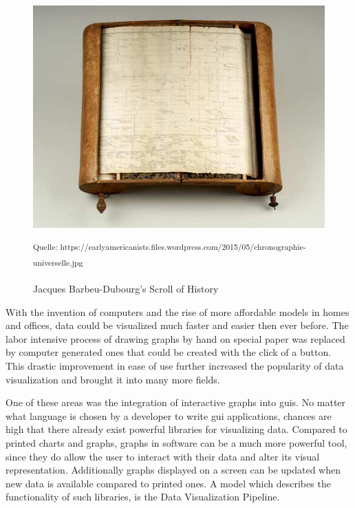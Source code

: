 \begin{figure}[h]
    \centering
    \includegraphics[width=12cm]{resources/img/ScrollOfHistory}
    \caption{Jacques Barbeu-Dubourg's Scroll of History}
    \small\textsuperscript{Quelle: https://earlyamericanists.files.wordpress.com/2015/05/chronographie-universelle.jpg}
    \label{fig:historyscroll}
\end{figure}

With the invention of computers and the rise of more affordable models in homes
and offices, data could be visualized much faster and easier then ever before.
The labor intensive process of drawing graphs by hand on special paper was
replaced by computer generated ones that could be created with the click of a
button. This drastic improvement in ease of use further increased the popularity
of data visualization and brought it into many more fields.
\cite{DataVisHistory2}

One of these areas was the integration of interactive graphs into \glspl{gui}.
No matter what language is chosen by a developer to write \gls{gui}
applications, chances are high that there already exist powerful libraries for
visualizing data. Compared to printed charts and graphs, graphs in software can
be a much more powerful tool, since they do allow the user to interact with
their data and alter its visual representation. Additionally graphs
displayed on a screen can be updated when new data is available compared to
printed ones. A model which describes the functionality of such libraries, is
the Data Visualization Pipeline.
\cite{VisIdioms}





